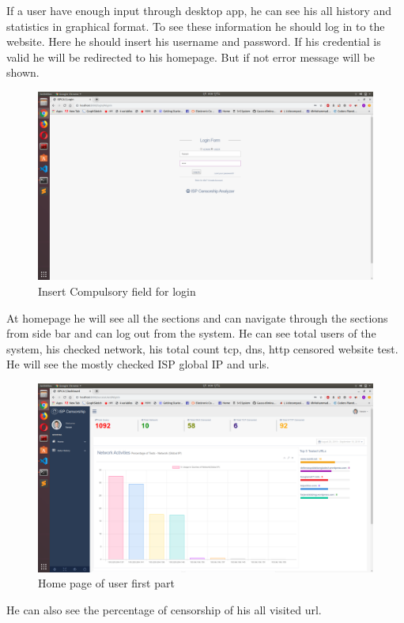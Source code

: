 If a user have enough input through desktop app, he can see his all history and statistics in graphical format. To see these information he should log in to the website. Here he should insert his username and password. If his credential is valid he will be redirected to his homepage. But if not error message will be shown. 
\begin{figure}[h]
    \centering
    \includegraphics[width=\textwidth]{website/1login.png}
    \caption{Insert Compulsory field for login}
    \label{fig:web3}
\end{figure}

At homepage he will see all the sections and can navigate through the sections from side bar and can log out from the system. He can see total users of the system, his checked network, his total count tcp, dns, http censored website test. He will see the mostly checked ISP global IP and urls.

\begin{figure}[h]
    \centering
    \includegraphics[width=\textwidth]{website/2userhome.png}
    \caption{Home page of user first part}
    \label{fig:web4}
\end{figure}
He can also see the percentage of censorship of his all visited url.

